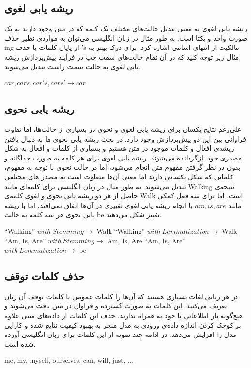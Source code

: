 \subsection{ریشه یابی لغوی}
\label{chap5sec2sub2}
ریشه یابی‌ لغوی به معنی‌ تبدیل حالت‌های مختلف یک کلمه که در متن وجود دارند به یک صورت واحد و یکتا است. به طور مثال در زبان انگلیسی می‌‌توان به مواردی نظیر حذف
ing
از پایان کلمات یا حذف
's
مالکیت از انتهای اسامی اشاره کرد. برای درک بهتر به مثال زیر توجه کنید که در آن تمام حالت‌های سمت چپ در فرآیند پیش‌پردازش  ریشه یابی  لغوی به حالت سمت راست تبدیل می‌‌شوند.\\
\begin{latin}
	$car, cars, car's, cars' \rightarrow car$
\end{latin}


\subsection{ریشه یابی نحوی}
\label{chap5sec2sub3}
علی‌رغم نتایج یکسان برای ریشه یابی‌ لغوی و نحوی در بسیاری از حالت‌ها، اما تفاوت فراوانی‌ بین این دو پیش‌پردازش وجود دارد. در بحث ریشه یابی‌ نحوی ما به دنبال یافتن ریشه‌ی افعال و کلمات موجود در متن هستیم و بسیاری از کلمات و افعال به شکل مصدری خود بازگردانده می‌‌شوند. ریشه یابی‌ لغوی برای هر کلمه به صورت جداگانه و بدون در نظر گرفتن مفهوم متن انجام می‌‌شود، اما در حالت نحوی با توجه به مفهوم، کلماتی‌ که شکل یکسانی دارند اما معنی آن‌ها متفاوت است به مصدر های مختلفی تبدیل می‌‌شوند. به طور مثال در زبان انگلیسی‌ برای کلمه‌ای‌ مانند
Walking
نتیجه‌ی حاصل از هر دو ریشه یابی‌ نحوی و لغوی کلمه‌ی
Walk
است. اما برای سه‌ فعل کمکی‌ مانند
$am, is, are$
با انجام ریشه یابی‌ لغوی تغییری در آن‌ها اتفاق نمی‌افتد، اما با ریشه یابی  نحوی هر سه‌ کلمه به حالت
be
تغییر شکل می‌‌دهند.\\
\begin{latin}
	``Walking'' $ with \ Stemming \rightarrow$ Walk \quad\quad ``Walking'' $ with \ Lemmatization \rightarrow$ Walk\\


	``Am, Is, Are'' $ with \ Stemming \rightarrow$ Am, Is, Are \quad\quad ``Am, Is, Are'' $ with \ Lemmatization \rightarrow$ be\\
\end{latin}

\subsection{حذف کلمات توقف}
\label{chap5sec2sub4}
در هر زبانی لغات بسیاری هستند که آن‌ها را کلمات عمومی یا کلمات توقف آن زبان تعریف می‌‌کنند. این کلمات به صورت گسترده و فراوان در متن یافت می‌‌شوند و هیچ‌گونه بار اطلاعاتی با خود به همراه ندارند. حذف این کلمات از داده‌های متنی علاوه بر کوچک کردن اندازه داده‌ی ورودی به مدل منجر به بهبود کیفیت نتایج شده و کارایی مدل را افزایش می‌‌دهد. در ادامه چند نمونه از این کلمات برای زبان انگلیسی‌ آورده شده است.\\
\begin{latin}
	me, my, myself, ourselves, can, will, just, ...
\end{latin}



